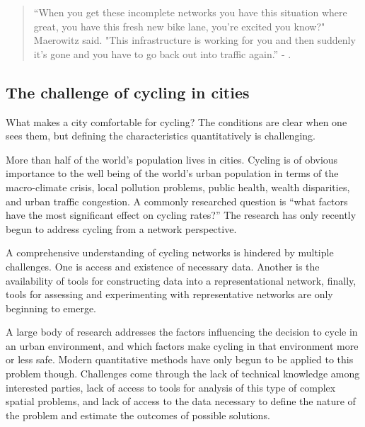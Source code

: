 

\begin{quote}
``When you get these incomplete networks you have this situation where great, you have this fresh new bike lane, you're excited you know?" Maerowitz said. "This infrastructure is working for you and then suddenly it's gone and you have to go back out into traffic again.'' - \cite{juhasz2019}.
\end{quote}
 
\subsection{The challenge of cycling in cities}

What makes a city comfortable for cycling? The conditions are clear when one sees them, but defining the characteristics quantitatively is challenging. 

More than half of the world's population lives in cities. Cycling is of obvious importance to the well being of the world's  urban population in terms of the macro-climate crisis, local pollution problems,  public health, wealth disparities, and urban traffic congestion. A commonly researched question is ``what factors have the most significant effect on cycling rates?'' The research has only recently begun to address cycling from a network perspective. 

A comprehensive understanding of cycling networks is hindered by multiple challenges. One is access and existence of necessary data. Another is the availability of tools for constructing data into a representational network, finally, tools for assessing and experimenting with representative networks are only beginning to emerge. 

A large body of research addresses the factors influencing the decision to cycle in an urban environment, and which factors make cycling in that environment more or less safe. Modern quantitative methods have only begun to be applied to this problem though. Challenges come through the lack of technical knowledge among interested parties, lack of access to tools for analysis of this type of complex spatial problems, and lack of access to the data necessary to define the nature of the problem and estimate the outcomes of possible solutions. 

